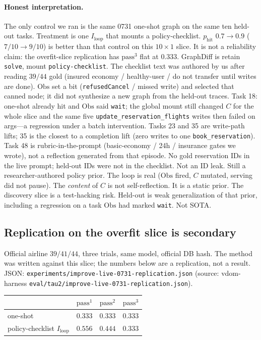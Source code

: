 \documentclass{article}
\begin{document}
\paragraph{Honest interpretation.}
The only control we ran is the same 0731 one-shot graph on the same ten held-out tasks. Treatment is one \(I_{\mathrm{loop}}\) that mounts a policy-checklist. \(p_{\mathrm{hit}}\) \(0.7\to 0.9\) (\(7/10\to 9/10\)) is better than that control on this \(10\times 1\) slice. It is not a reliability claim: the overfit-slice replication has \(\mathrm{pass}^3\) flat at \(0.333\). GraphDiff is retain \texttt{solve}, mount \texttt{policy-checklist}. The checklist text was authored by us after reading \(39/44\) gold (insured economy / healthy-user / do not transfer until writes are done). \(\mathrm{Obs}\) set a bit (\texttt{refusedCancel} / missed write) and selected that canned node; it did not synthesize a new graph from the held-out traces. Task 18: one-shot already hit and \(\mathrm{Obs}\) said \texttt{wait}; the global mount still changed \(C\) for the whole slice and the same five \texttt{update\_reservation\_flights} writes then failed on args---a regression under a batch intervention. Tasks 23 and 35 are write-path lifts; 35 is the closest to a completion lift (zero writes to one \texttt{book\_reservation}). Task 48 is rubric-in-the-prompt (basic-economy / 24h / insurance gates we wrote), not a reflection generated from that episode. No gold reservation IDs in the live prompt; held-out IDs were not in the checklist. Not an ID leak. Still a researcher-authored policy prior. The loop is real (\(\mathrm{Obs}\) fired, \(C\) mutated, serving did not pause). The \emph{content} of \(C\) is not self-reflection. It is a static prior. The discovery slice is a test-hacking risk. Held-out is weak generalization of that prior, including a regression on a task \(\mathrm{Obs}\) had marked \texttt{wait}. Not SOTA.

\subsection{Replication on the overfit slice is secondary}
\label{sec:airrep}

Official airline \(39/41/44\), three trials, same model, official DB hash. The method was written against this slice; the numbers below are a replication, not a result. JSON: \texttt{experiments/improve-live-0731-replication.json} (source: vdom-harness \texttt{eval/tau2/improve-live-0731-replication.json}).

\begin{center}
\small
\begin{tabular}{lccc}
\toprule
 & \(\mathrm{pass}^1\) & \(\mathrm{pass}^2\) & \(\mathrm{pass}^3\) \\
\midrule
one-shot & \(0.333\) & \(0.333\) & \(0.333\) \\
policy-checklist \(I_{\mathrm{loop}}\) & \(0.556\) & \(0.444\) & \(0.333\) \\
\bottomrule
\end{tabular}
\end{center}
\end{document}
